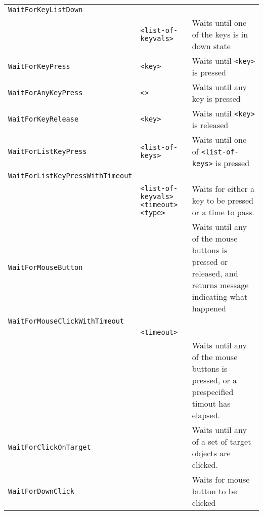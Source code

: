 \begin{longtable}{p{3cm}p{3cm}p{6cm}}
\verb+WaitForKeyListDown+ & & \\ 
& \verb+<list-of-keyvals>+ & Waits until one of the keys is in down state\\ 
\verb+WaitForKeyPress+ &\verb+<key>+ &Waits until \verb+<key>+ is pressed\\ 
\verb+WaitForAnyKeyPress+ &\hspace{0.5cm} \verb+<>+ &Waits until any key is pressed\\ 
\verb+WaitForKeyRelease+ &\hspace{0.5cm} \verb+<key>+ & Waits until \verb+<key>+ is released\\ 
\verb+WaitForListKeyPress+ &\hspace{0.5cm}\verb+<list-of-keys>+ &Waits until one of \verb+<list-of-keys>+ is pressed \\ 
\verb+WaitForListKeyPressWithTimeout+&\\
&\verb+<list-of-keyvals>+ \verb+<timeout>+ \verb+<type>+ & Waits for either a key to be pressed or a time to pass.\\
\verb+WaitForMouseButton+ & &Waits until any of the mouse buttons is pressed or released, and returns message indicating what happened \\ 
\verb+WaitForMouseClickWithTimeout+ \\&\verb+<timeout>+\\
& &Waits until any of the mouse buttons is pressed, or a prespecified timout has elapsed. \\ 
\verb+WaitForClickOnTarget+ & &Waits until any of a set of target objects are clicked.\\ 
\verb+WaitForDownClick+ & &Waits for mouse button to be clicked \\ 


\end{longtable}
